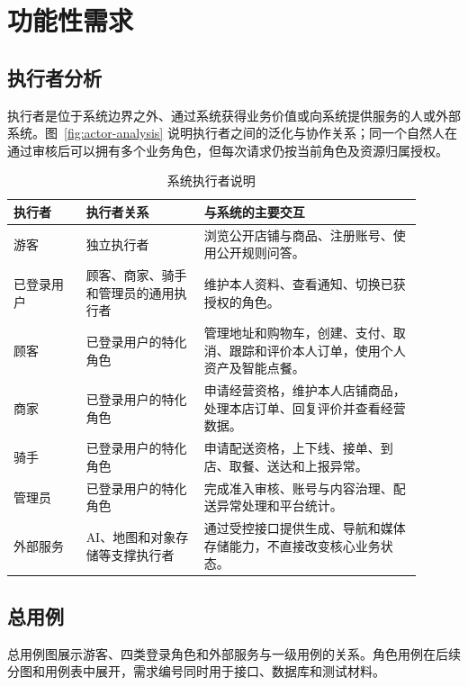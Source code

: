 \section{功能性需求}

\subsection{执行者分析}

执行者是位于系统边界之外、通过系统获得业务价值或向系统提供服务的人或外部系统。图~\ref{fig:actor-analysis} 说明执行者之间的泛化与协作关系；同一个自然人在通过审核后可以拥有多个业务角色，但每次请求仍按当前角色及资源归属授权。


\begin{longtable}{|L{0.16\linewidth}|L{0.26\linewidth}|L{0.48\linewidth}|}
\caption{系统执行者说明}\label{tab:actors}\\ \hline
\textbf{执行者} & \textbf{执行者关系} & \textbf{与系统的主要交互} \\ \hline
游客 & 独立执行者 & 浏览公开店铺与商品、注册账号、使用公开规则问答。 \\ \hline
已登录用户 & 顾客、商家、骑手和管理员的通用执行者 & 维护本人资料、查看通知、切换已获授权的角色。 \\ \hline
顾客 & 已登录用户的特化角色 & 管理地址和购物车，创建、支付、取消、跟踪和评价本人订单，使用个人资产及智能点餐。 \\ \hline
商家 & 已登录用户的特化角色 & 申请经营资格，维护本人店铺商品，处理本店订单、回复评价并查看经营数据。 \\ \hline
骑手 & 已登录用户的特化角色 & 申请配送资格，上下线、接单、到店、取餐、送达和上报异常。 \\ \hline
管理员 & 已登录用户的特化角色 & 完成准入审核、账号与内容治理、配送异常处理和平台统计。 \\ \hline
外部服务 & AI、地图和对象存储等支撑执行者 & 通过受控接口提供生成、导航和媒体存储能力，不直接改变核心业务状态。 \\ \hline
\end{longtable}

\subsection{总用例}


总用例图展示游客、四类登录角色和外部服务与一级用例的关系。角色用例在后续分图和用例表中展开，需求编号同时用于接口、数据库和测试材料。
